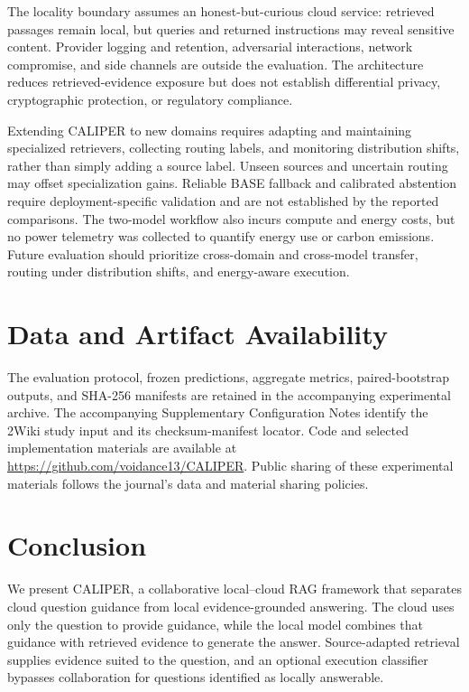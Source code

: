 \documentclass[a4paper,fleqn]{cas-dc}
\begin{document}
The locality boundary assumes an honest-but-curious cloud service: retrieved passages remain local, but queries and returned instructions may reveal sensitive content. Provider logging and retention, adversarial interactions, network compromise, and side channels are outside the evaluation. The architecture reduces retrieved-evidence exposure but does not establish differential privacy, cryptographic protection, or regulatory compliance.

Extending CALIPER to new domains requires adapting and maintaining specialized retrievers, collecting routing labels, and monitoring distribution shifts, rather than simply adding a source label. Unseen sources and uncertain routing may offset specialization gains. Reliable BASE fallback and calibrated abstention require deployment-specific validation and are not established by the reported comparisons. The two-model workflow also incurs compute and energy costs, but no power telemetry was collected to quantify energy use or carbon emissions. Future evaluation should prioritize cross-domain and cross-model transfer, routing under distribution shifts, and energy-aware execution.

\section*{Data and Artifact Availability}
The evaluation protocol, frozen predictions, aggregate metrics, paired-bootstrap outputs, and SHA-256 manifests are retained in the accompanying experimental archive. The accompanying Supplementary Configuration Notes identify the 2Wiki study input and its checksum-manifest locator. Code and selected implementation materials are available at \url{https://github.com/voidance13/CALIPER}. Public sharing of these experimental materials follows the journal's data and material sharing policies.

\section{Conclusion}
We present CALIPER, a collaborative local--cloud RAG framework that separates cloud question guidance from local evidence-grounded answering. The cloud uses only the question to provide guidance, while the local model combines that guidance with retrieved evidence to generate the answer. Source-adapted retrieval supplies evidence suited to the question, and an optional execution classifier bypasses collaboration for questions identified as locally answerable.
\end{document}
